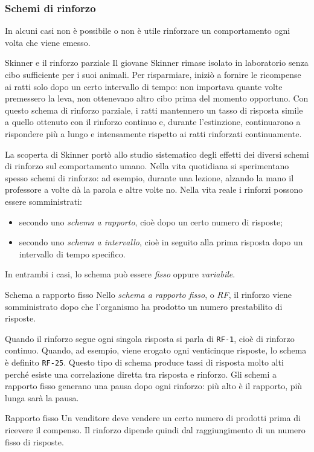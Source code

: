\documentclass[a4paper]{article}
\begin{document}
\subsubsection{Schemi di rinforzo}
In alcuni casi non è possibile o non è utile rinforzare un comportamento ogni volta che viene emesso.
\begin{snippetexample}{Skinner e il rinforzo parziale}
    Il giovane Skinner rimase isolato in laboratorio senza cibo sufficiente per i suoi animali. Per risparmiare, iniziò a fornire le ricompense ai ratti solo dopo un certo intervallo di tempo: non importava quante volte premessero la leva, non ottenevano altro cibo prima del momento opportuno. Con questo schema di rinforzo parziale, i ratti mantennero un tasso di risposta simile a quello ottenuto con il rinforzo continuo e, durante l'estinzione, continuarono a rispondere più a lungo e intensamente rispetto ai ratti rinforzati continuamente.
\end{snippetexample}
La scoperta di Skinner portò allo studio sistematico degli effetti dei diversi schemi di rinforzo sul comportamento umano. Nella vita quotidiana si sperimentano spesso schemi di rinforzo: ad esempio, durante una lezione, alzando la mano il professore a volte dà la parola e altre volte no.
Nella vita reale i rinforzi possono essere somministrati:
\begin{itemize}
    \item secondo uno \emph{schema a rapporto}, cioè dopo un certo numero di risposte;
    \item secondo uno \emph{schema a intervallo}, cioè in seguito alla prima risposta dopo un intervallo di tempo specifico.
\end{itemize}
In entrambi i casi, lo schema può essere \emph{fisso} oppure \emph{variabile}.
\begin{snippetdefinition}{Schema a rapporto fisso}
    Nello \emph{schema a rapporto fisso}, o \emph{RF}, il rinforzo viene somministrato dopo che l'organismo ha prodotto un numero prestabilito di risposte.
\end{snippetdefinition}
Quando il rinforzo segue ogni singola risposta si parla di \texttt{RF-1}, cioè di rinforzo continuo. Quando, ad esempio, viene erogato ogni venticinque risposte, lo schema è definito \texttt{RF-25}. Questo tipo di schema produce tassi di risposta molto alti perché esiste una correlazione diretta tra risposta e rinforzo. Gli schemi a rapporto fisso generano una pausa dopo ogni rinforzo: più alto è il rapporto, più lunga sarà la pausa.
\begin{snippetexample}{Rapporto fisso}
    Un venditore deve vendere un certo numero di prodotti prima di ricevere il compenso. Il rinforzo dipende quindi dal raggiungimento di un numero fisso di risposte.
\end{snippetexample}
\end{document}
